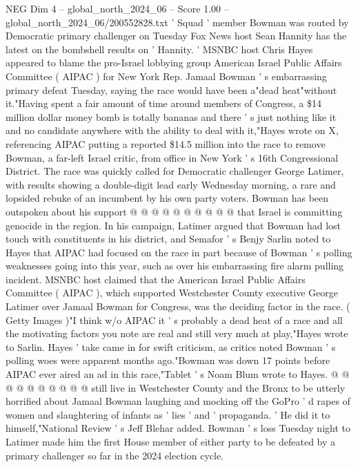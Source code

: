 \begin{textsample}{NEG Dim 4 – global\_north\_2024\_06 – Score 1.00 – global\_north\_2024\_06/200552828.txt}  \label{ex:f4_neg_325}
' Squad ' member Bowman was routed by Democratic primary challenger on Tuesday Fox News host Sean Hannity has the latest on the bombshell results on ' Hannity. ' MSNBC host Chris Hayes appeared to blame the pro-Israel lobbying group American Israel Public Affairs Committee ( AIPAC ) for New York Rep.
Jamaal Bowman ' s embarrassing primary defeat Tuesday, saying the race would have been a"dead heat"without it."Having spent a fair amount of time around members of Congress, a \$14 million dollar money bomb is totally bananas and there ' s just nothing like it and no candidate anywhere with the ability to deal with it,"Hayes wrote on X, referencing AIPAC putting a reported \$14.5 million into the race to remove Bowman, a far-left Israel critic, from office in New York ' s 16th Congressional District.
The race was quickly called for Democratic challenger George Latimer, with results showing a double-digit lead early Wednesday morning, a rare and lopsided rebuke of an incumbent by his own party voters.
Bowman has been outspoken about his support @ @ @ @ @ @ @ @ @ @ that Israel is committing genocide in the region.
In his campaign, Latimer argued that Bowman had lost touch with constituents in his district, and Semafor ' s Benjy Sarlin noted to Hayes that AIPAC had focused on the race in part because of Bowman ' s polling weaknesses going into this year, such as over his embarrassing fire alarm pulling incident.
MSNBC host claimed that the American Israel Public Affairs Committee ( AIPAC ), which supported Westchester County executive George Latimer over Jamaal Bowman for Congress, was the deciding factor in the race. ( Getty Images )"I think w/o AIPAC it ' s probably a dead heat of a race and all the motivating factors you note are real and still very much at play,"Hayes wrote to Sarlin.
Hayes ' take came in for swift criticism, as critics noted Bowman ' s polling woes were apparent months ago."Bowman was down 17 points before AIPAC ever aired an ad in this race,"Tablet ' s Noam Blum wrote to Hayes. @ @ @ @ @ @ @ @ @ @ still live in Westchester County and the Bronx to be utterly horrified about Jamaal Bowman laughing and mocking off the GoPro ' d rapes of women and slaughtering of infants as ' lies ' and ' propaganda. ' He did it to himself,"National Review ' s Jeff Blehar added.
Bowman ' s loss Tuesday night to Latimer made him the first House member of either party to be defeated by a primary challenger so far in the 2024 election cycle.

\end{textsample}

